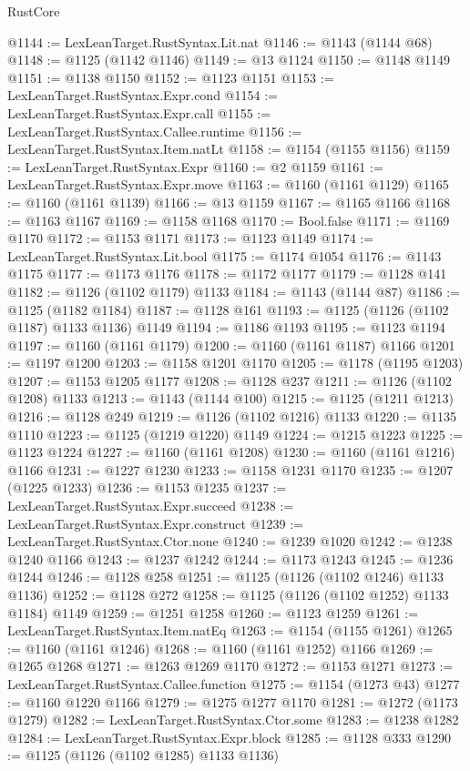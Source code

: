 \begin{lexlean}{RustCore}
\begin{coremodule}
@1144 := LexLeanTarget.RustSyntax.Lit.nat
@1146 := @1143 (@1144 @68)
@1148 := @1125 (@1142 @1146)
@1149 := @13 @1124
@1150 := @1148 @1149
@1151 := @1138 @1150
@1152 := @1123 @1151
@1153 := LexLeanTarget.RustSyntax.Expr.cond
@1154 := LexLeanTarget.RustSyntax.Expr.call
@1155 := LexLeanTarget.RustSyntax.Callee.runtime
@1156 := LexLeanTarget.RustSyntax.Item.natLt
@1158 := @1154 (@1155 @1156)
@1159 := LexLeanTarget.RustSyntax.Expr
@1160 := @2 @1159
@1161 := LexLeanTarget.RustSyntax.Expr.move
@1163 := @1160 (@1161 @1129)
@1165 := @1160 (@1161 @1139)
@1166 := @13 @1159
@1167 := @1165 @1166
@1168 := @1163 @1167
@1169 := @1158 @1168
@1170 := Bool.false
@1171 := @1169 @1170
@1172 := @1153 @1171
@1173 := @1123 @1149
@1174 := LexLeanTarget.RustSyntax.Lit.bool
@1175 := @1174 @1054
@1176 := @1143 @1175
@1177 := @1173 @1176
@1178 := @1172 @1177
@1179 := @1128 @141
@1182 := @1126 (@1102 @1179) @1133
@1184 := @1143 (@1144 @87)
@1186 := @1125 (@1182 @1184)
@1187 := @1128 @161
@1193 := @1125 (@1126 (@1102 @1187) @1133 @1136) @1149
@1194 := @1186 @1193
@1195 := @1123 @1194
@1197 := @1160 (@1161 @1179)
@1200 := @1160 (@1161 @1187) @1166
@1201 := @1197 @1200
@1203 := @1158 @1201 @1170
@1205 := @1178 (@1195 @1203)
@1207 := @1153 @1205 @1177
@1208 := @1128 @237
@1211 := @1126 (@1102 @1208) @1133
@1213 := @1143 (@1144 @100)
@1215 := @1125 (@1211 @1213)
@1216 := @1128 @249
@1219 := @1126 (@1102 @1216) @1133
@1220 := @1135 @1110
@1223 := @1125 (@1219 @1220) @1149
@1224 := @1215 @1223
@1225 := @1123 @1224
@1227 := @1160 (@1161 @1208)
@1230 := @1160 (@1161 @1216) @1166
@1231 := @1227 @1230
@1233 := @1158 @1231 @1170
@1235 := @1207 (@1225 @1233)
@1236 := @1153 @1235
@1237 := LexLeanTarget.RustSyntax.Expr.succeed
@1238 := LexLeanTarget.RustSyntax.Expr.construct
@1239 := LexLeanTarget.RustSyntax.Ctor.none
@1240 := @1239 @1020
@1242 := @1238 @1240 @1166
@1243 := @1237 @1242
@1244 := @1173 @1243
@1245 := @1236 @1244
@1246 := @1128 @258
@1251 := @1125 (@1126 (@1102 @1246) @1133 @1136)
@1252 := @1128 @272
@1258 := @1125 (@1126 (@1102 @1252) @1133 @1184) @1149
@1259 := @1251 @1258
@1260 := @1123 @1259
@1261 := LexLeanTarget.RustSyntax.Item.natEq
@1263 := @1154 (@1155 @1261)
@1265 := @1160 (@1161 @1246)
@1268 := @1160 (@1161 @1252) @1166
@1269 := @1265 @1268
@1271 := @1263 @1269 @1170
@1272 := @1153 @1271
@1273 := LexLeanTarget.RustSyntax.Callee.function
@1275 := @1154 (@1273 @43)
@1277 := @1160 @1220 @1166
@1279 := @1275 @1277 @1170
@1281 := @1272 (@1173 @1279)
@1282 := LexLeanTarget.RustSyntax.Ctor.some
@1283 := @1238 @1282
@1284 := LexLeanTarget.RustSyntax.Expr.block
@1285 := @1128 @333
@1290 := @1125 (@1126 (@1102 @1285) @1133 @1136)

\end{coremodule}
\end{lexlean}
